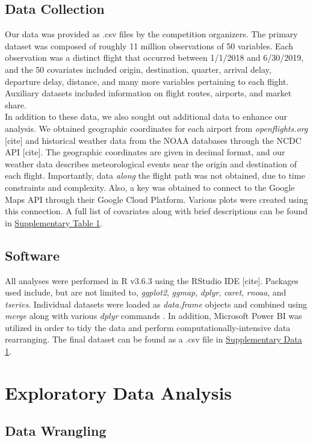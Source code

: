 \documentclass[12pt, a4paper, openany]{book}
\newcommand\tab[1][1cm]{\hspace*{#1}}
\begin{document}
	\section{Data Collection}
	\tab Our data was provided as .csv files by the competition organizers. The primary dataset was composed of roughly 11 million observations of 50 variables. Each observation was a distinct flight that occurred between 1/1/2018 and 6/30/2019, and the 50 covariates included origin, destination, quarter, arrival delay, departure delay, distance, and many more variables pertaining to each flight. Auxiliary datasets included information on flight routes, airports, and market share. \\
	\tab In addition to these data, we also sought out additional data to enhance our analysis. We obtained geographic coordinates for each airport from \textit{openflights.org} [cite] and historical weather data from the NOAA databases through the NCDC API [cite]. The geographic coordinates are given in decimal format, and our weather data describes meteorological events near the origin and destination of each flight. Importantly, data \textit{along} the flight path was not obtained, due to time constraints and complexity. Also, a key was obtained to connect to the Google Maps API through their Google Cloud Platform. Various plots were created using this connection. A full list of covariates along with brief descriptions can be found in \underline{Supplementary Table 1}. 
	\section{Software}
	\tab All analyses were performed in R v3.6.3 using the RStudio IDE [cite]. Packages used include, but are not limited to, \textit{ggplot2}, \textit{ggmap}, \textit{dplyr}, \textit{caret}, \textit{rnoaa}, and \textit{tseries}. Individual datasets were loaded as \textit{data.frame} objects and combined using \textit{merge} along with various \textit{dplyr} commands . In addition, Microsoft Power BI was utilized in order to tidy the data and perform computationally-intensive data rearranging. The final dataset can be found as a .csv file in \underline{Supplementary Data 1}.
	
\chapter{Exploratory Data Analysis}

	\section{Data Wrangling}
	
\end{document}
